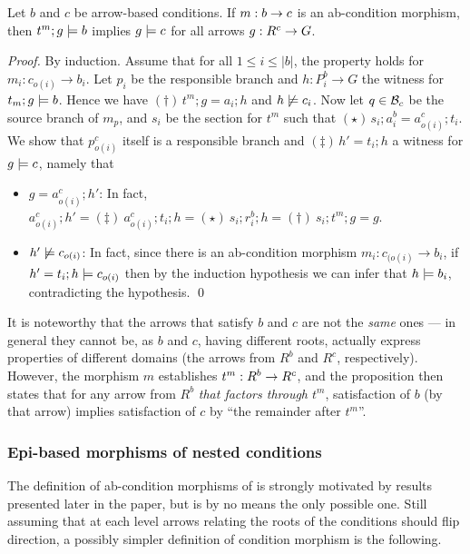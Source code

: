 \begin{proposition}
Let $b$ and $c$  be arrow-based conditions. If $m:b\rightarrow c$ is an ab-condition morphism, then $t^m;g\models b$ implies $g \models c$ for all arrows $g:R^c\rightarrow G$.
\end{proposition}
%
\emph{Proof.} By induction. Assume that for all $1\leq i\leq |b|$, the property holds for $m_i:c_{o(i)} \to b_i$. Let $p_i$ be the responsible branch and $h: P^b_i \to G$ the witness for $t_m;g\models b$. 
Hence we have $(\dagger)\, t^m; g=a_i;h$ and $h \not\models c_i$.  Now let $q \in \mathcal{B}_c$ be the source branch of $m_{p}$, and $s_i$ be the section for $t^m$ such that $(\star)\, s_i;a^b_i = a^c_{o(i)}; t_i$. 
We show that $p^c_{o(i)}$ itself is a responsible branch and $(\ddagger)\, h'=t_i;h$ a witness for $g\models c$, namely that 
\begin{itemize}
\item $g = a^c_{o(i)};h'$: In fact, $a^c_{o(i)};h' =\!(\ddagger)\ a^c_{o(i)};t_i;h =\!(\star)\ s_i;r^b_i; h  =\!(\dagger)\ s_i;t^m;g = g$. 
\item $h' \not\models c_{o(i)}$: In fact, since there is an ab-condition morphism $m_i: c_{(o(i)} \to b_i$, if $h'= t_i;h \models c_{o(i)}$ then by the induction hypothesis we can infer that $h \models b_i$, contradicting the hypothesis. \qed
\end{itemize}

It is noteworthy that the arrows that satisfy $b$ and $c$ are not the \emph{same} ones --- in general they cannot be, as $b$ and $c$, having different roots, actually express properties of different domains (the arrows from $R^b$ and $R^c$, respectively). However, the morphism $m$ establishes $t^m:R^b\rightarrow R^c$, and the proposition then states that for any arrow from $R^b$ \emph{that factors through $t^m$}, satisfaction of $b$ (by that arrow) implies satisfaction of $c$ by ``the remainder after $t^m$''.


\subsubsection{Epi-based morphisms of nested conditions}

The definition of ab-condition morphisms of  is strongly motivated by results presented later in the paper, but is by no means the only possible one. Still assuming that at each level arrows relating the roots of the conditions should flip direction, a possibly simpler definition of condition morphism is the following.  


